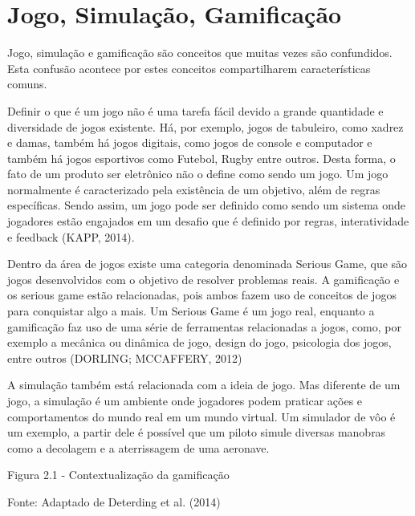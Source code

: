 \documentclass[
	12pt,				%
	oneside,			%
	a4paper,			%
	english,			%
	french,				%
	spanish,			%
	brazil,				%
	]{abntex2}
\begin{document}
\section{Jogo, Simulação, Gamificação}

Jogo, simulação e gamificação são conceitos que muitas vezes são confundidos. Esta confusão acontece por estes conceitos compartilharem características comuns.

Definir o que é um jogo não é uma tarefa fácil devido a grande quantidade e diversidade de jogos existente. Há, por exemplo, jogos de tabuleiro, como xadrez e damas, também há jogos digitais, como jogos de console e computador e também há jogos esportivos como Futebol, Rugby entre outros. Desta forma, o fato de um produto ser eletrônico não o define como sendo um jogo. Um jogo normalmente é caracterizado pela existência de um objetivo, além de regras específicas. Sendo assim, um jogo pode ser definido como sendo um sistema onde jogadores estão engajados em um desafio que é definido por regras, interatividade e feedback (KAPP, 2014). 

Dentro da área de jogos existe uma categoria denominada Serious Game, que são jogos desenvolvidos com o objetivo de resolver problemas reais. A gamificação e os serious game estão relacionadas, pois ambos fazem uso de conceitos de jogos para conquistar algo a mais. Um Serious Game é um jogo real, enquanto a gamificação faz uso de uma série de ferramentas relacionadas a jogos, como, por exemplo a mecânica ou dinâmica de jogo, design do jogo, psicologia dos jogos, entre outros (DORLING; MCCAFFERY, 2012)

A simulação também está relacionada com a ideia de jogo. Mas diferente de um jogo, a simulação é um ambiente onde jogadores podem praticar ações e comportamentos do mundo real em um mundo virtual. Um simulador de vôo é um exemplo, a partir dele é possível que um piloto simule diversas manobras como a decolagem e a aterrissagem de uma aeronave.

Figura 2.1 - Contextualização da gamificação 

Fonte: Adaptado de Deterding et al. (2014)

\end{document}

